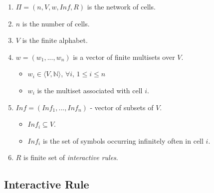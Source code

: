 \documentclass{article}
\begin{document}
\begin{appendices}
\begin{enumerate}
   \item $\Pi = (n, V, w, Inf, R)$ is the network of cells.
   \item $n$ is the number of cells.
   \item $V$ is the finite alphabet.
   \item $w = (w_1,...,w_n)$ is a vector of finite multisets over $V$.
         \begin{itemize}
         \item $w_i \in \langle V, \mathbb{N} \rangle$, $\forall i$, $1 \leq i \leq n$
         \item $w_i$ is the multiset associated with cell $i$.
         \end{itemize}
   \item $Inf = (Inf_1,...,Inf_n)$ - vector of subsets of $V$.
         \begin{itemize}
         \item $Inf_i \subseteq  V$.
         \item $Inf_i$ is the set of symbols occurring infinitely often in cell $i$.
         \end{itemize}
   \item $R$ is finite set of \emph{interactive rules}.
\end{enumerate}


\subsection{Interactive Rule} \label{a-ff1-rule}


\end{appendices}
\end{document}
